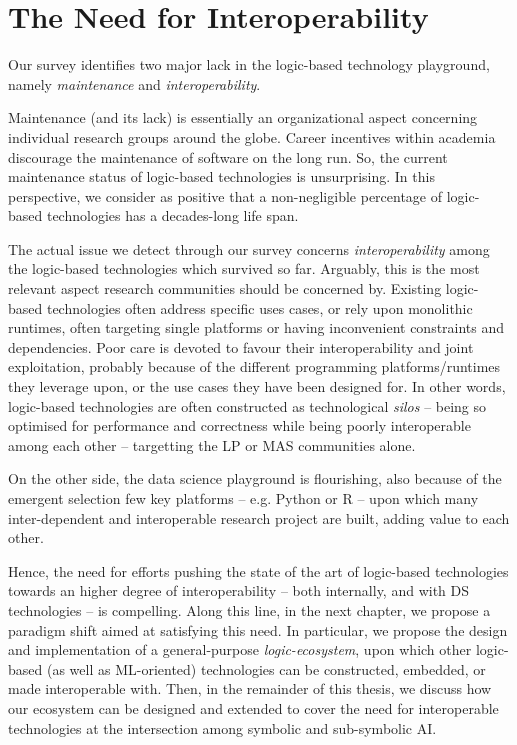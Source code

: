 \documentclass[12pt,a4paper,openright,twoside]{book}
\begin{document}
\section*{The Need for Interoperability}


Our survey identifies two major lack in the logic-based technology playground, namely \emph{maintenance} and \emph{interoperability}.

Maintenance (and its lack) is essentially an organizational aspect concerning individual research groups around the globe.
%
Career incentives within academia discourage the maintenance of software on the long run.
%
So, the current maintenance status of logic-based technologies is unsurprising.
%
In this perspective, we consider as positive that a non-negligible percentage of logic-based technologies has a decades-long life span.

The actual issue we detect through our survey concerns \emph{interoperability} among the logic-based technologies which survived so far.
%
Arguably, this is the most relevant aspect research communities should be concerned by.
%
Existing logic-based technologies often address specific uses cases, or rely upon monolithic runtimes, often targeting single platforms or having inconvenient constraints and dependencies.
%
Poor care is devoted to favour their interoperability and joint exploitation, probably because of the different programming platforms/runtimes they leverage upon, or the use cases they have been designed for.
%
In other words, logic-based technologies are often constructed as technological \emph{silos} -- being so optimised for performance and correctness while being poorly interoperable among each other -- targetting the LP or MAS communities alone.

On the other side, the data science playground is flourishing, also because of the emergent selection few key platforms -- e.g. Python or R -- upon which many inter-dependent and interoperable research project are built, adding value to each other.

Hence, the need for efforts pushing the state of the art of logic-based technologies towards an higher degree of interoperability -- both internally, and with DS technologies -- is compelling.
%
Along this line, in the next chapter, we propose a paradigm shift aimed at satisfying this need.
%
In particular, we propose the design and implementation of a general-purpose \emph{logic-ecosystem}, upon which other logic-based (as well as ML-oriented) technologies can be constructed, embedded, or made interoperable with.
%
Then, in the remainder of this thesis, we discuss how our ecosystem can be designed and extended to cover the need for interoperable technologies at the intersection among symbolic and sub-symbolic AI.
\end{document}
